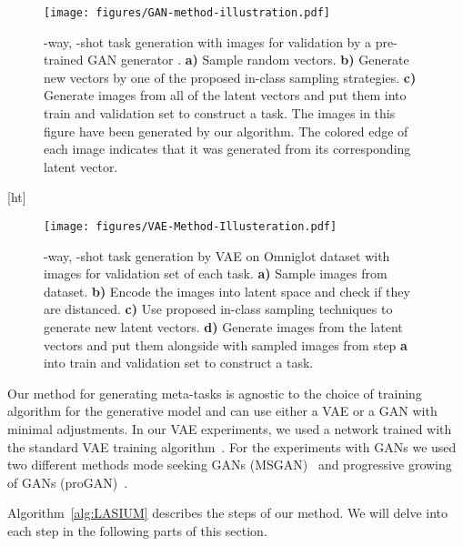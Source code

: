 \documentclass{article}
\begin{document}
\begin{figure}[ht]
    \centering
    \texttt{[image: figures/GAN-method-illustration.pdf]}
    \caption{-way, -shot task generation with  images for validation by a pre-trained GAN generator . \textbf{a)} Sample  random vectors. \textbf{b)} Generate new vectors by one of the proposed in-class sampling strategies. \textbf{c)} Generate images from all of the latent vectors and put them into train and validation set to construct a task.
    The images in this figure have been generated by our algorithm. 
    The colored edge of each image indicates that it was generated from its corresponding latent vector.
    }
    \label{fig:method-gan}
    \end{figure}[ht]
\begin{figure}
    \centering
    \texttt{[image: figures/VAE-Method-Illusteration.pdf]}
    \caption{-way, -shot task generation by VAE on Omniglot dataset with  images for validation set of each task. \textbf{a)} Sample  images from  dataset. \textbf{b)} Encode the images into latent space and check if they are distanced. \textbf{c)} Use proposed in-class sampling techniques to generate new latent vectors. \textbf{d)} Generate images from the latent vectors and put them alongside with sampled images from step \textbf{a} into train and validation set to construct a task.}
    \label{fig:method-vae}
\end{figure}




Our method for generating meta-tasks is agnostic to the choice of training algorithm for the generative model and can use either a VAE or a GAN with minimal adjustments. In our VAE experiments, we used a network trained with the standard VAE training algorithm~\cite{kingma2013auto}. For the experiments with GANs we used two different methods mode seeking GANs (MSGAN)~\cite{mode-gan-Qi2019} and progressive growing of GANs (proGAN)~\cite{karras2017progressive}. 

 Algorithm~\ref{alg:LASIUM} describes the steps of our method. We will delve into each step in the following parts of this section.
\end{document}
